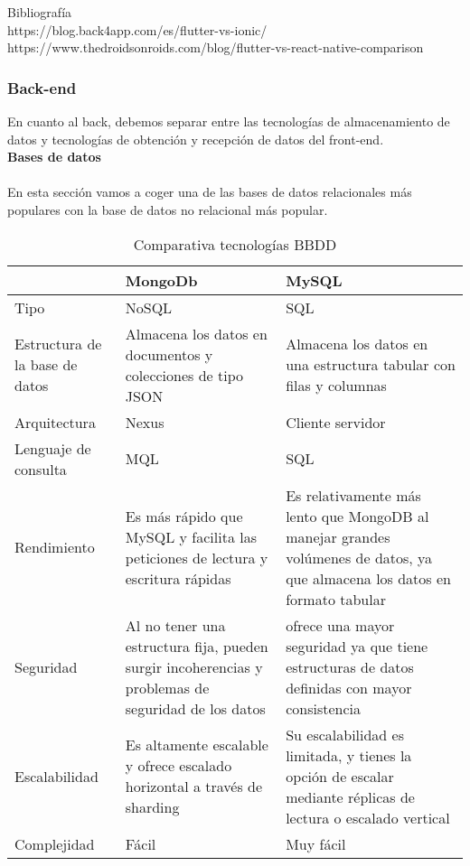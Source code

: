 Bibliografía \\

https://blog.back4app.com/es/flutter-vs-ionic/ \\
https://www.thedroidsonroids.com/blog/flutter-vs-react-native-comparison

\subsubsection{Back-end}

En cuanto al back, debemos separar entre las tecnologías de almacenamiento de datos y tecnologías de obtención y recepción de datos del front-end. \\

\textbf{Bases de datos} \\ \\
En esta sección vamos a coger una de las bases de datos relacionales más populares con la base de datos no relacional más popular. 
\begin{table}[H] %
    \centering
    \begin{tabular}{|p{2cm} |p{4 cm} |p{4cm} |} \hline 
         &  \textbf{MongoDb}&  \textbf{MySQL}\\  \hline 
         Tipo &  NoSQL &  SQL \\ \hline 
         
        Estructura de la base de datos &  Almacena los datos en documentos y colecciones de tipo JSON &  Almacena los datos en una estructura tabular con filas y columnas \\ \hline 
        Arquitectura &  Nexus &  Cliente servidor\\ \hline 
        Lenguaje de consulta &  MQL &  SQL\\ \hline 
        Rendimiento &  Es más rápido que MySQL y facilita las peticiones de lectura y escritura rápidas &  	Es relativamente más lento que MongoDB al manejar grandes volúmenes de datos, ya que almacena los datos en formato tabular \\ \hline 
        Seguridad &  Al no tener una estructura fija, pueden surgir incoherencias y problemas de seguridad de los datos &  ofrece una mayor seguridad ya que tiene estructuras de datos definidas con mayor consistencia \\ \hline
        Escalabilidad &  Es altamente escalable y ofrece escalado horizontal a través de sharding &  Su escalabilidad es limitada, y tienes la opción de escalar mediante réplicas de lectura o escalado vertical \\ \hline
        Complejidad &  Fácil &  Muy fácil \\ \hline
        
    \end{tabular}
    \caption{Comparativa tecnologías BBDD}
    \label{tab:tec_db}
\end{table}

